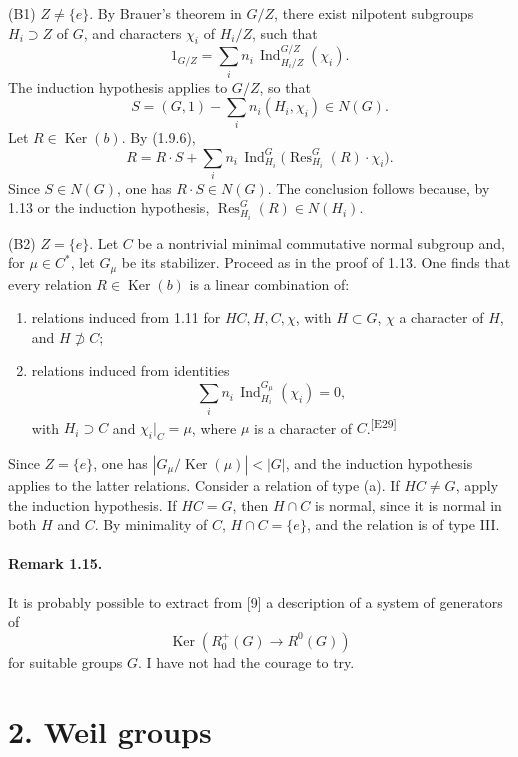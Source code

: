 \documentclass[10pt,letterpaper]{article}
\newcommand{\Ind}{\operatorname{Ind}}
\newcommand{\Res}{\operatorname{Res}}
\providecommand{\Ker}{\operatorname{Ker}}
\providecommand{\Ind}{\operatorname{Ind}}
\providecommand{\Ker}{\operatorname{Ker}}
\newcommand{\auditmark}[1]{\textsuperscript{\normalfont\scriptsize[E#1]}}
\begin{document}
(B1) \(Z\ne\{e\}\). By Brauer's theorem in \(G/Z\), there exist nilpotent subgroups \(H_i\supset Z\) of \(G\), and characters \(\chi_i\) of \(H_i/Z\), such that
\[
1_{G/Z}=\sum_i n_i\,\Ind_{H_i/Z}^{G/Z}(\chi_i).
\]
The induction hypothesis applies to \(G/Z\), so that
\[
S=(G,1)-\sum_i n_i(H_i,\chi_i)\in N(G).
\]
Let \(R\in\Ker(b)\). By (1.9.6),
\[
R=R\cdot S+\sum_i n_i\,\Ind_{H_i}^G\bigl(\Res_{H_i}^G(R)\cdot\chi_i\bigr).
\]
Since \(S\in N(G)\), one has \(R\cdot S\in N(G)\). The conclusion follows because, by 1.13 or the induction hypothesis, \(\Res_{H_i}^G(R)\in N(H_i)\).

(B2) \(Z=\{e\}\). Let \(C\) be a nontrivial minimal commutative normal subgroup and, for \(\mu\in C^*\), let \(G_\mu\) be its stabilizer. Proceed as in the proof of 1.13. One finds that every relation \(R\in\Ker(b)\) is a linear combination of:
\begin{enumerate}[label=(\alph*)]
\item relations induced from 1.11 for \(HC,H,C,\chi\), with \(H\subset G\), \(\chi\) a character of \(H\), and \(H\not\supset C\);
\item relations induced from identities
\[
\sum_i n_i\,\Ind_{H_i}^{G_\mu}(\chi_i)=0,
\]
with \(H_i\supset C\) and \(\chi_i|_C=\mu\), where \(\mu\) is a character of \(C\).\auditmark{29}
\end{enumerate}
Since \(Z=\{e\}\), one has \(|G_\mu/\Ker(\mu)|<|G|\), and the induction hypothesis applies to the latter relations. Consider a relation of type (a). If \(HC\ne G\), apply the induction hypothesis. If \(HC=G\), then \(H\cap C\) is normal, since it is normal in both \(H\) and \(C\). By minimality of \(C\), \(H\cap C=\{e\}\), and the relation is of type III.

\paragraph{Remark 1.15.} It is probably possible to extract from [9] a description of a system of generators of
\[
\Ker(R^+_0(G)\longrightarrow R^0(G))
\]
for suitable groups \(G\). I have not had the courage to try.

\section*{2. Weil groups}
\end{document}
